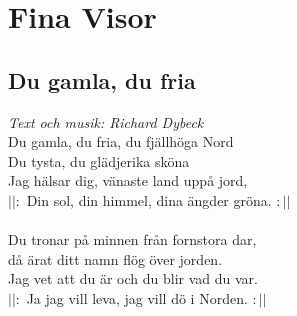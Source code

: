 \chapter{Fina Visor}
\section{Du gamla, du fria}
\textit{Text och musik: Richard Dybeck}
\vspace{2mm}\\
Du gamla, du fria, du fjällhöga Nord\\
Du tysta, du glädjerika sköna\\
Jag hälsar dig, vänaste land uppå jord,\\
$||:$ Din sol, din himmel, dina ängder gröna. $:||$\\
\\
Du tronar på minnen från fornstora dar,\\
då ärat ditt namn flög över jorden.\\
Jag vet att du är och du blir vad du var.\\
$||:$ Ja jag vill leva, jag vill dö i Norden. $:||$
\newpage

